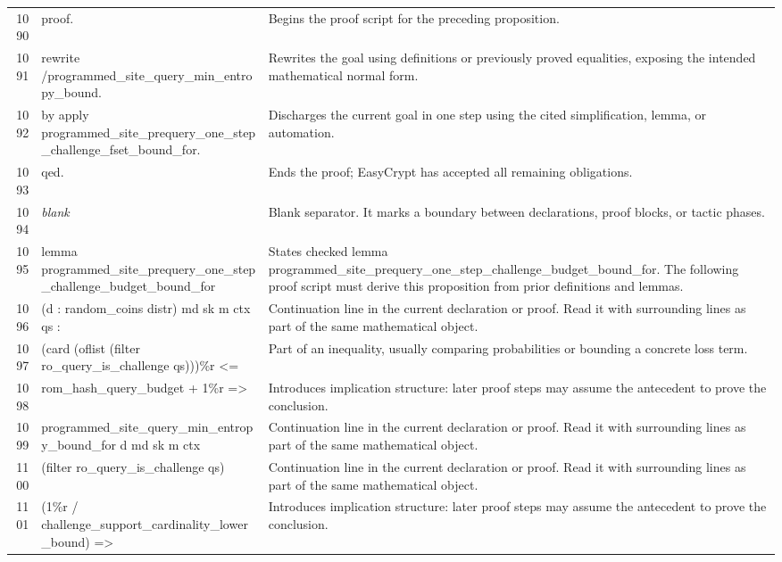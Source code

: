 \documentclass[10pt]{article}
\begin{document}
\begin{longtable}{r L{0.53\textwidth} L{0.37\textwidth}}
1090 & {\ttfamily\scriptsize proof.} & Begins the proof script for the preceding proposition. \\
1091 & {\ttfamily\scriptsize rewrite /programmed\_site\_query\_min\_entropy\_bound.} & Rewrites the goal using definitions or previously proved equalities, exposing the intended mathematical normal form. \\
1092 & {\ttfamily\scriptsize by apply programmed\_site\_prequery\_one\_step\_challenge\_fset\_bound\_for.} & Discharges the current goal in one step using the cited simplification, lemma, or automation. \\
1093 & {\ttfamily\scriptsize qed.} & Ends the proof; EasyCrypt has accepted all remaining obligations. \\
1094 & {\ttfamily\scriptsize \emph{blank}} & Blank separator.  It marks a boundary between declarations, proof blocks, or tactic phases. \\
1095 & {\ttfamily\scriptsize lemma programmed\_site\_prequery\_one\_step\_challenge\_budget\_bound\_for} & States checked lemma programmed\_site\_prequery\_one\_step\_challenge\_budget\_bound\_for.  The following proof script must derive this proposition from prior definitions and lemmas. \\
1096 & {\ttfamily\scriptsize   (d : random\_coins distr) md sk m ctx qs :} & Continuation line in the current declaration or proof.  Read it with surrounding lines as part of the same mathematical object. \\
1097 & {\ttfamily\scriptsize   (card (oflist (filter ro\_query\_is\_challenge qs)))\%r <=} & Part of an inequality, usually comparing probabilities or bounding a concrete loss term. \\
1098 & {\ttfamily\scriptsize     rom\_hash\_query\_budget + 1\%r =>} & Introduces implication structure: later proof steps may assume the antecedent to prove the conclusion. \\
1099 & {\ttfamily\scriptsize   programmed\_site\_query\_min\_entropy\_bound\_for d md sk m ctx} & Continuation line in the current declaration or proof.  Read it with surrounding lines as part of the same mathematical object. \\
1100 & {\ttfamily\scriptsize     (filter ro\_query\_is\_challenge qs)} & Continuation line in the current declaration or proof.  Read it with surrounding lines as part of the same mathematical object. \\
1101 & {\ttfamily\scriptsize     (1\%r / challenge\_support\_cardinality\_lower\_bound) =>} & Introduces implication structure: later proof steps may assume the antecedent to prove the conclusion. \\

\end{longtable}
\end{document}
